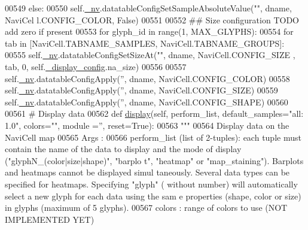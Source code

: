 \begin{DoxyCode}
00549             \textcolor{keywordflow}{else}:
00550                 self.\hyperlink{classnavicom_1_1navicom_1_1NaviCom_afff3fd56fa16a68bab52ba8d801e325a}{_nv}.datatableConfigSetSampleAbsoluteValue(\textcolor{stringliteral}{""}, dname, NaviCel
      l.CONFIG\_COLOR, \textcolor{keyword}{False})
00551 
00552         \textcolor{comment}{## Size configuration TODO add zero if present}
00553         \textcolor{keywordflow}{for} glyph\_id \textcolor{keywordflow}{in} range(1, MAX\_GLYPHS):
00554             \textcolor{keywordflow}{for} tab \textcolor{keywordflow}{in} [NaviCell.TABNAME\_SAMPLES, NaviCell.TABNAME\_GROUPS]:
00555                 self.\hyperlink{classnavicom_1_1navicom_1_1NaviCom_afff3fd56fa16a68bab52ba8d801e325a}{_nv}.datatableConfigSetSizeAt(\textcolor{stringliteral}{""}, dname, NaviCell.CONFIG\_SIZE
      , tab, 0, self.\hyperlink{classnavicom_1_1navicom_1_1NaviCom_ab8ddca454f674629472d8bfec46ac76f}{_display_config}.na\_size)
00556 
00557         self.\hyperlink{classnavicom_1_1navicom_1_1NaviCom_afff3fd56fa16a68bab52ba8d801e325a}{_nv}.datatableConfigApply(\textcolor{stringliteral}{''}, dname, NaviCell.CONFIG\_COLOR)
00558         self.\hyperlink{classnavicom_1_1navicom_1_1NaviCom_afff3fd56fa16a68bab52ba8d801e325a}{_nv}.datatableConfigApply(\textcolor{stringliteral}{''}, dname, NaviCell.CONFIG\_SIZE)
00559         self.\hyperlink{classnavicom_1_1navicom_1_1NaviCom_afff3fd56fa16a68bab52ba8d801e325a}{_nv}.datatableConfigApply(\textcolor{stringliteral}{''}, dname, NaviCell.CONFIG\_SHAPE)
00560         
00561     \textcolor{comment}{# Display data}
00562     \textcolor{keyword}{def }\hyperlink{classnavicom_1_1navicom_1_1NaviCom_ad7d4390d700d4a6d2533647887f8ab94}{display}(self, perform\_list, default\_samples="all: 1.0\textcolor{stringliteral}{", colors="}\textcolor{stringliteral}{", module
      ='', reset=True):}
00563 \textcolor{stringliteral}{        }\textcolor{stringliteral}{"""}
00564 \textcolor{stringliteral}{        Display data on the NaviCell map}
00565 \textcolor{stringliteral}{        Args :}
00566 \textcolor{stringliteral}{            perform\_list (list of 2-tuples): each tuple must contain the name of 
      the data to display and the mode of display ("glyphN\_(color|size|shape)", "barplo
      t", "heatmap" or "map\_staining"). Barplots and heatmaps cannot be displayed simul
      taneously. Several data types can be specified for heatmaps. Specifying "glyph" (
      without number) will automatically select a new glyph for each data using the sam
      e properties (shape, color or size) in glyphs (maximum of 5 glyphs).}
00567 \textcolor{stringliteral}{            colors : range of colors to use (NOT IMPLEMENTED YET)}

\end{DoxyCode}
